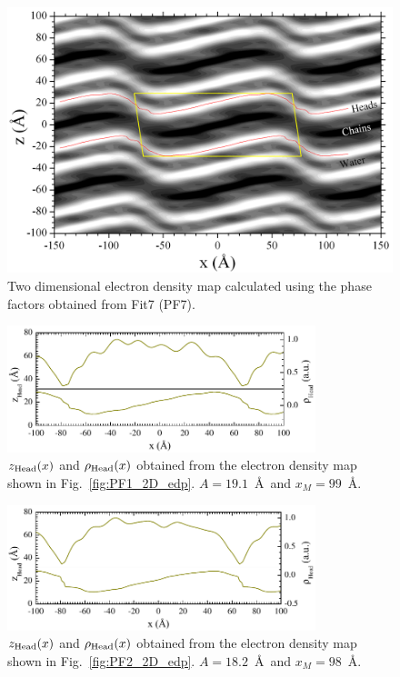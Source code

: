 \begin{landscape}
\begin{figure}
  \centering
  \includegraphics[width=0.85\linewidth]{figures/ripple/LAXS/Fit7_2D_edp}
  \caption[]{Two dimensional electron density map calculated using the phase
  factors obtained from Fit7 (PF7).}
  \label{fig:PF7_2D_edp}
\end{figure} 
\end{landscape}

\begin{figure}[htbp]
  \centering
  \includegraphics[width=0.8\textwidth]{figures/ripple/LAXS/PF1_headgroup}
  \caption{$z_\text{Head}(x)$ and $\rho_\text{Head}(x)$ obtained from the electron density map
  shown in Fig.~\ref{fig:PF1_2D_edp}.
  $A = 19.1$~\AA\ and $x_M = 99$~\AA.}
  \label{fig:PF1_headgroup}
\end{figure}

\begin{figure}[htbp]
  \centering
  \includegraphics[width=0.8\textwidth]{figures/ripple/LAXS/PF2_headgroup}
  \caption{$z_\text{Head}(x)$ and $\rho_\text{Head}(x)$ obtained from the electron density map
  shown in Fig.~\ref{fig:PF2_2D_edp}.
  $A = 18.2$~\AA\ and $x_M = 98$~\AA.}
  \label{fig:PF2_headgroup}
\end{figure}

